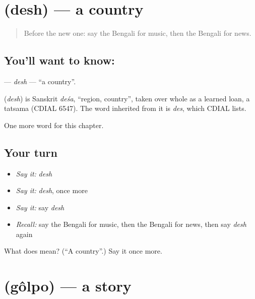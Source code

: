 \section[\texorpdfstring{\bn{দেশ} (desh)}{দেশ (desh)}]{ (desh) — a country}

\label{lesson:BN-C89-desh}



\begin{quote}
Before the new one: say the Bengali for music, then the Bengali for news.
\end{quote}

\subsection*{You'll want to know: }
\textbf{} — \emph{desh} — \textquotedblleft{}a country\textquotedblright{}.

\begin{cousinweb}
\textbf{} (\emph{desh}) is Sanskrit \emph{deśa}, \textquotedblleft{}region, country\textquotedblright{}, taken over whole as a learned loan, a tatsama (CDIAL 6547). The word inherited from it is \emph{des}, which CDIAL lists.
\end{cousinweb}

\begin{grammarlens}[title={What you've built}]
One more word for this chapter.
\end{grammarlens}

\subsection*{Your turn}
\begin{itemize}
\raggedright
  \item \emph{Say it:} \emph{desh}
  \item \emph{Say it:} \emph{desh}, once more
  \item \emph{Say it:} say \emph{desh}
  \item \emph{Recall:} say the Bengali for music, then the Bengali for news, then say \emph{desh} again
\end{itemize}

\begin{tcolorbox}[breakable,colback=teal!4,colframe=teal!35!black,title={Before you move on}]
What does  mean? (\textquotedblleft{}A country\textquotedblright{}.) Say it once more.
\end{tcolorbox}
\section[\texorpdfstring{\bn{গল্প} (gôlpo)}{গল্প (gôlpo)}]{ (gôlpo) — a story}

